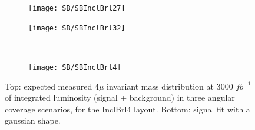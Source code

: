 \documentclass[a4paper,twoside,12pt]{book}
\begin{document}
\begin{figure}
\begin{subfigure}{.5\linewidth}
\texttt{[image: SB/SBInclBrl27]}
\caption{}
\label{fig:SBInclBrl27}
\end{subfigure}
\begin{subfigure}{.5\linewidth}
\centering
\texttt{[image: SB/SBInclBrl32]}
\caption{}
\label{fig:SBInclBrl32}
\end{subfigure}\\[1ex]
\begin{subfigure}{\linewidth}
\centering
\texttt{[image: SB/SBInclBrl4]}
\caption{}
\label{fig:SBInclBrl4}
\end{subfigure}
\caption{Top: expected measured $4\mu$ invariant mass distribution at 3000 $fb^{-1}$ of integrated luminosity (signal + background) in
	three angular coverage scenarios, for the InclBrl4 layout. Bottom: signal fit with a gaussian shape.	 }
\label{fig:SB}
\end{figure}
\end{document}
